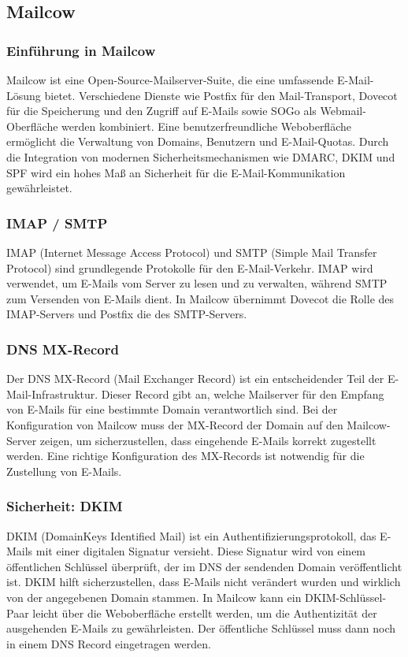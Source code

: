 \subsection{Mailcow}

\subsubsection{Einführung in Mailcow}
Mailcow ist eine Open-Source-Mailserver-Suite, die eine umfassende E-Mail-Lösung bietet. Verschiedene Dienste wie Postfix für den Mail-Transport, Dovecot für die Speicherung und den Zugriff auf E-Mails sowie SOGo als Webmail-Oberfläche werden kombiniert. Eine benutzerfreundliche Weboberfläche ermöglicht die Verwaltung von Domains, Benutzern und E-Mail-Quotas. Durch die Integration von modernen Sicherheitsmechanismen wie DMARC, DKIM und SPF wird ein hohes Maß an Sicherheit für die E-Mail-Kommunikation gewährleistet.

\subsubsection{IMAP / SMTP}
IMAP (Internet Message Access Protocol) und SMTP (Simple Mail Transfer Protocol) sind grundlegende Protokolle für den E-Mail-Verkehr. IMAP wird verwendet, um E-Mails vom Server zu lesen und zu verwalten, während SMTP zum Versenden von E-Mails dient. In Mailcow übernimmt Dovecot die Rolle des IMAP-Servers und Postfix die des SMTP-Servers.

\subsubsection{DNS MX-Record}
Der DNS MX-Record (Mail Exchanger Record) ist ein entscheidender Teil der E-Mail-Infrastruktur. Dieser Record gibt an, welche Mailserver für den Empfang von E-Mails für eine bestimmte Domain verantwortlich sind. Bei der Konfiguration von Mailcow muss der MX-Record der Domain auf den Mailcow-Server zeigen, um sicherzustellen, dass eingehende E-Mails korrekt zugestellt werden. Eine richtige Konfiguration des MX-Records ist notwendig für die Zustellung von E-Mails.

\subsubsection{Sicherheit: DKIM}
DKIM (DomainKeys Identified Mail) ist ein Authentifizierungsprotokoll, das E-Mails mit einer digitalen Signatur versieht. Diese Signatur wird von einem öffentlichen Schlüssel überprüft, der im DNS der sendenden Domain veröffentlicht ist. DKIM hilft sicherzustellen, dass E-Mails nicht verändert wurden und wirklich von der angegebenen Domain stammen. In Mailcow kann ein DKIM-Schlüssel-Paar leicht über die Weboberfläche erstellt werden, um die Authentizität der ausgehenden E-Mails zu gewährleisten. Der öffentliche Schlüssel muss dann noch in einem DNS Record eingetragen werden.

